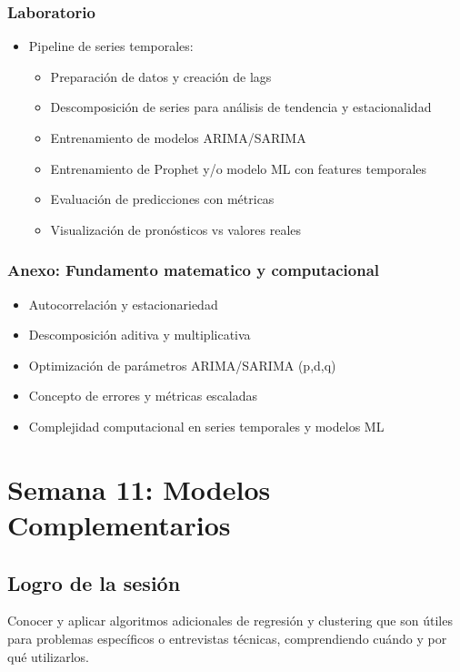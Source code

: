 \documentclass[12pt,a4paper,openany,oneside]{book}
\begin{document}
\begin{itemize}
\subsection{Laboratorio}
\begin{itemize}
    \item Pipeline de series temporales:
    \begin{itemize}
        \item Preparación de datos y creación de lags
        \item Descomposición de series para análisis de tendencia y estacionalidad
        \item Entrenamiento de modelos ARIMA/SARIMA
        \item Entrenamiento de Prophet y/o modelo ML con features temporales
        \item Evaluación de predicciones con métricas
        \item Visualización de pronósticos vs valores reales
    \end{itemize}
\end{itemize}

\subsection{Anexo: Fundamento matematico y computacional}
\begin{itemize}
    \item Autocorrelación y estacionariedad
    \item Descomposición aditiva y multiplicativa
    \item Optimización de parámetros ARIMA/SARIMA (p,d,q)
    \item Concepto de errores y métricas escaladas
    \item Complejidad computacional en series temporales y modelos ML
\end{itemize}

\chapter{Semana 11: Modelos Complementarios}

\section{Logro de la sesión}
Conocer y aplicar algoritmos adicionales de regresión y clustering que son útiles para problemas específicos o entrevistas técnicas, comprendiendo cuándo y por qué utilizarlos.


\end{itemize}
\end{document}
